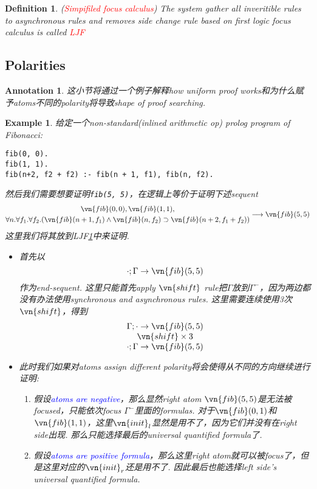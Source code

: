 \documentclass{article}
\theoremstyle{plain}
\newtheorem{example}[theorem]{Example}
\newtheorem{definition}[theorem]{Definition}
\newtheorem{annotation}[theorem]{Annotation}
\theoremstyle{nonumberplain}
\newcommand{\redt}[1]{\textcolor{red}{#1}}
\newcommand{\bluet}[1]{\textcolor{blue}{#1}}
\begin{document}
\begin{definition}\label{LJF}
\rm (\redt{Simpifiled focus calculus}) The system gather all inveritible rules to asynchronous rules and removes side change rule based on first logic focus calculus is called \redt{LJF}
\end{definition}


\newpage
\subsection{Polarities}

\begin{annotation}
\rm 这小节将通过一个例子解释how uniform proof works和为什么赋予atoms不同的polarity将导致shape of proof searching.
\end{annotation}

\begin{example}
\rm 给定一个non-standard(inlined arithmetic op) prolog program of Fibonacci:
\begin{lstlisting}[basicstyle={\normalsize\ttfamily}]
fib(0, 0).
fib(1, 1).
fib(n+2, f2 + f2) :- fib(n + 1, f1), fib(n, f2).
\end{lstlisting}
然后我们需要想要证明\texttt{fib(5, 5)}，在逻辑上等价于证明下述sequent
\[
\begin{gathered}
\vn{fib}(0,0), \vn{fib}(1,1), \\
\forall n.\forall f_1.\forall f_2.(\vn{fib}(n+1,f_1) \wedge \vn{fib}(n,f_2) \supset \vn{fib}(n+2,f_1+f_2)) 
\end{gathered}
\longrightarrow \vn{fib}(5,5)
\]
这里我们将其放到LJF\ref{LJF}中来证明. 
\begin{itemize}
	\item 首先以
	\[
		\cdot;\Gamma \to \vn{fib}(5,5)
	\]
	作为end-sequent. 这里只能首先apply $\vn{shift}$ rule把$\Gamma$放到$\Gamma^-$，因为两边都没有办法使用synchronous and asynchronous rules. 这里需要连续使用3次$\vn{shift}$，得到
	\[
		\deduce{\cdot;\Gamma \to \vn{fib}(5,5)}{\deduce{\vn{shift} \times 3}{\Gamma;\cdot \to \vn{fib}(5,5)}}
	\]
	\item 此时我们如果对atoms assign different polarity将会使得从不同的方向继续进行证明:
	\begin{enumerate}
		\item 假设\bluet{atoms are negative}，那么显然right atom $\vn{fib}(5,5)$是无法被focused，只能依次focus $\Gamma^-$里面的formulas. 对于$\vn{fib}(0,1)$和$\vn{fib}(1,1)$，这里$\vn{init}_l$显然是用不了，因为它们并没有在right side出现. 那么只能选择最后的universal quantified formula了.
		\item 假设\bluet{atoms are positive formula}，那么这里right atom就可以被focus了，但是这里对应的$\vn{init}_r$还是用不了. 因此最后也能选择left side's universal quantified formula. 

\end{enumerate}
\end{itemize}
\end{example}
\end{document}
